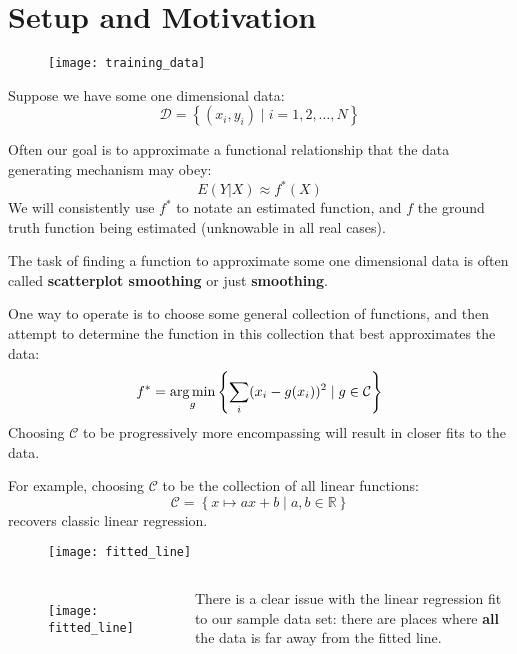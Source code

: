 \section{Setup and Motivation}
%
\begin{frame}
  \begin{figure}
    \texttt{[image: training\_data]}
  \end{figure}
  Suppose we have some one dimensional data:
  $$\mathcal{D} = \left\{ (x_i, y_i) \mid i = 1,2,\ldots,N \right\}$$
\end{frame}
%
\begin{frame}
  Often our goal is to approximate a functional relationship that the data generating mechanism may obey:
  $$E(Y|X) \approx f^*(X)$$
  We will consistently use $f^*$ to notate an estimated function, and $f$ the ground truth function being estimated (unknowable in all real cases).
\end{frame}
%
\begin{frame}
  The task of finding a function to approximate some one dimensional data is often called \textbf{scatterplot smoothing} or just \textbf{smoothing}.
\end{frame}
%
\begin{frame}
  One way to operate is to choose some general collection of functions, and then attempt to determine the function in this collection that best approximates the data:
  $$ f^* = \operatorname*{arg\,min}_{g} \left\{ \sum_i (x_i - g(x_i))^2 \mid g \in \mathcal{C} \right\} $$
  Choosing $\mathcal{C}$ to be progressively more encompassing will result in closer fits to the data.
\end{frame}
%
\begin{frame}
  For example, choosing $\mathcal{C}$ to be the collection of all linear functions:
  $$ \mathcal{C} = \left\{ x \mapsto ax + b \mid a,b \in \mathbb{R} \right\} $$
recovers classic linear regression.
  \begin{figure}
    \texttt{[image: fitted\_line]}
  \end{figure}
\end{frame}
%
\begin{frame}
  \begin{columns}
      \begin{figure}
        \texttt{[image: fitted\_line]}
      \end{figure}
      There is a clear issue with the linear regression fit to our sample data set: there are places where \textbf{all} the data is far away from the fitted line.
  \end{columns}
\end{frame}
